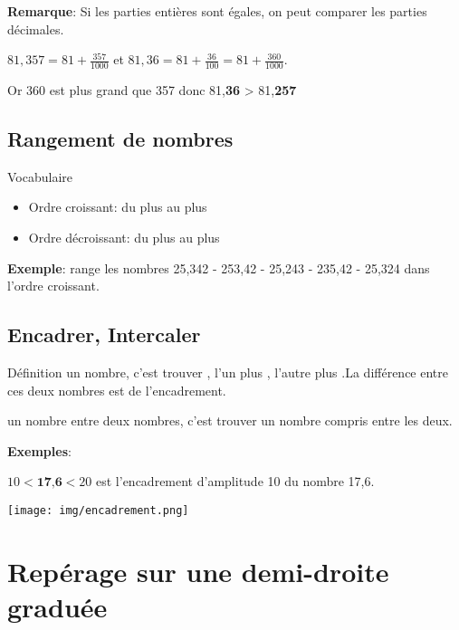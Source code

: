 \documentclass[12pt,a4paper]{article}
\begin{document}
\textbf{Remarque}: Si les parties entières  sont égales, on peut comparer les parties décimales.

$\displaystyle 81,357 = 81+\frac{357}{1000}$ et $\displaystyle 81,36 = 81+\frac{36}{100} = 81+\frac{360}{1000}$.

Or 360  est plus grand que 357  donc 81,\textbf{36} > 81,\textbf{257}
 
\subsection{Rangement de nombres}

\begin{definition}{Vocabulaire}
\begin{itemize}
\item Ordre croissant: du plus  au plus 
\item Ordre décroissant: du plus  au plus 
\end{itemize}
\end{definition}

\textbf{Exemple}: range les nombres 25,342 - 253,42 - 25,243 - 235,42 - 25,324 dans l'ordre croissant.


\subsection{Encadrer, Intercaler}

\begin{definition}{Définition}
 un nombre, c'est trouver , l'un plus , l'autre plus .La différence entre ces deux nombres est  de l'encadrement.

 un nombre entre deux nombres, c'est trouver un nombre compris entre les deux.
\end{definition}

\textbf{Exemples}:

$10 < \textbf{17,6} < 20$ est l'encadrement d'amplitude 10 du nombre 17,6.

\texttt{[image: img/encadrement.png]} 

\section{Repérage sur une demi-droite graduée}
\end{document}
